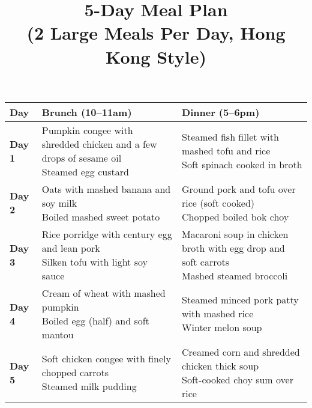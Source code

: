 \documentclass[12pt]{article}
\title{\textbf{5-Day Meal Plan}\\\large (2 Large Meals Per Day, Hong
Kong Style)}
\date{}
\begin{document}
\maketitle
\vspace{-1em}

\onehalfspacing
\renewcommand{\arraystretch}{1.8}
\setlength{\tabcolsep}{8pt}

\noindent\hspace*{\fill}
\begin{longtable}{|p{2.0cm}|p{6.95cm}|p{6.95cm}|}
  \hline
  \textbf{Day} & \textbf{Brunch (10--11am)} & \textbf{Dinner (5--6pm)} \\
  \hline
  \textbf{Day 1} &
  {\raggedright Pumpkin congee with shredded chicken and a few drops
    of sesame oil\\
  Steamed egg custard} &
  {\raggedright Steamed fish fillet with mashed tofu and rice\\
  Soft spinach cooked in broth} \\
  \hline
  \textbf{Day 2} &
  {\raggedright Oats with mashed banana and soy milk\\
  Boiled mashed sweet potato} &
  {\raggedright Ground pork and tofu over rice (soft cooked)\\
  Chopped boiled bok choy} \\
  \hline
  \textbf{Day 3} &
  {\raggedright Rice porridge with century egg and lean pork\\
  Silken tofu with light soy sauce} &
  {\raggedright Macaroni soup in chicken broth with egg drop and soft carrots\\
  Mashed steamed broccoli} \\
  \hline
  \textbf{Day 4} &
  {\raggedright Cream of wheat with mashed pumpkin\\
  Boiled egg (half) and soft mantou} &
  {\raggedright Steamed minced pork patty with mashed rice\\
  Winter melon soup} \\
  \hline
  \textbf{Day 5} &
  {\raggedright Soft chicken congee with finely chopped carrots\\
  Steamed milk pudding} &
  {\raggedright Creamed corn and shredded chicken thick soup\\
  Soft-cooked choy sum over rice} \\
  \hline
\end{longtable}
\hspace*{\fill}
\end{document}
